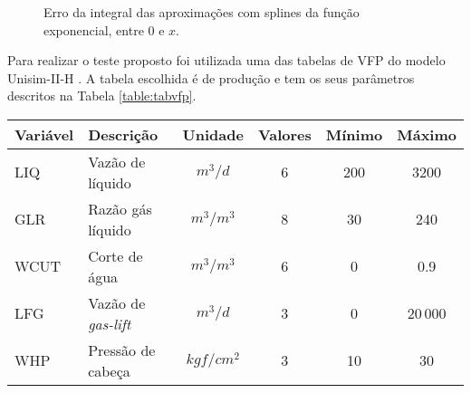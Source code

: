 \documentclass[final,5p]{elsarticle}
\numberwithin{equation}{section}
\begin{document}
        \begin{figure}[hbt!] 
            \caption{Erro da integral das aproximações com splines da função exponencial, entre 0 e $x$.}
            \label{fig:intexp}
        \end{figure}
        
        Para realizar o teste proposto foi utilizada uma das tabelas de VFP do modelo Unisim-II-H \cite{maschio2018case}. A tabela escolhida é de produção e tem os seus parâmetros descritos na Tabela \ref{table:tabvfp}.

        \begin{table*} 
            \caption{Parâmetros da tabela de VFP utilizada nas comparações. O parâmetro principal (BHP) é em $kgf/cm^2$.}
            \label{table:tabvfp}
            \begin{tabular}{ l l c c c c }
                \hline
                Variável & Descrição & Unidade & Valores & Mínimo & Máximo \\ 
                \hline
                LIQ  & Vazão de líquido         & $m^3/d$    & 6 & 200 &   3200 \\
                GLR  & Razão gás líquido        & $m^3/m^3$  & 8 & 30  &    240 \\
                WCUT & Corte de água            & $m^3/m^3$  & 6 &  0  &    0.9 \\
                LFG  & Vazão de \emph{gas-lift} & $m^3/d$    & 3 &  0  &  20$\,$000 \\
                WHP  & Pressão de cabeça        & $kgf/cm^2$ & 3 & 10  &     30 \\
                \hline
            \end{tabular}
        \end{table*}
\end{document}
